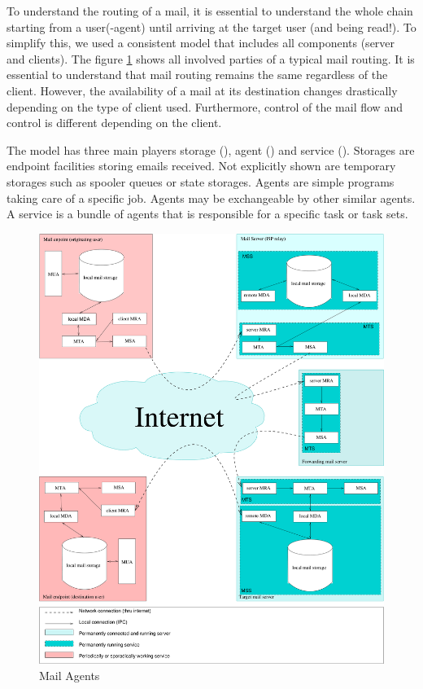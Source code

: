 To understand the routing of a mail, it is essential to understand the whole chain starting from a user(-agent) until arriving at the target user (and being read!). To simplify this, we used a consistent model that includes all components (server and clients). The figure \ref{fig:MailAgents} shows all involved parties of a typical mail routing. It is essential to understand that mail routing remains the same regardless of the client. However, the availability of a mail at its destination changes drastically depending on the type of client used. Furthermore, control of the mail flow and control is different depending on the client.

The model has three main players storage (), agent () and service (). Storages are endpoint facilities storing emails received. Not explicitly shown are temporary storages such as spooler queues or state storages. Agents are simple programs taking care of a specific job. Agents may be exchangeable by other similar agents. A service is a bundle of agents that is responsible for a specific task or task sets.

\begin{figure}[ht!]
	\centering\includegraphics[width=\columnwidth]{inc/MailAgents1.pdf}
	\caption{Mail Agents}\label{fig:MailAgents}
\end{figure}


